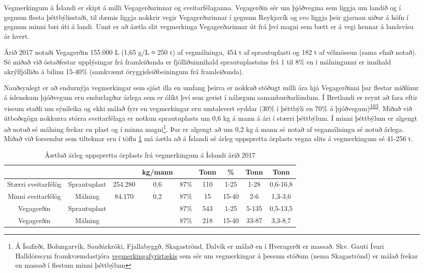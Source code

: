 \documentclass[icelandic,]{book}
\let\rmarkdownfootnote\footnote%
\def\footnote{\protect\rmarkdownfootnote}
\begin{document}
Vegmerkingum á Íslandi er skipt á milli Vegagerðarinnar og sveitarfélaganna. Vegagerðin sér um þjóðvegina sem liggja um landið og í gegnum flesta þéttbýlisstaði, til dæmis liggja nokkrir vegir Vegagerðarinnar í gegnum Reykjavík og svo liggja þeir gjarnan niður á höfn í gegnum minni bæi úti á landi. Unnt er að áætla slit vegmerkinga Vegagerðarinnar út frá því magni sem bætt er á vegi hennar á landsvísu ár hvert.

Árið 2017 notaði Vegagerðin 155.000 L (1,65 g/L ≈ 250 t) af vegmálningu, 454 t af sprautuplasti og 182 t af vélmössun (sama efnið notað). Sé miðað við óstaðfestar upplýsingar frá framleiðanda er fjölliðuinnihald sprautuplastsins frá 1 til 8\% en í málningunni er innihald akrýlfjölliða á bilinu 15-40\% (samkvæmt öryggisleiðbeiningum frá framleiðanda).

Nauðsynlegt er að endurnýja vegmerkingar sem sjást illa en umfang þeirra er nokkuð stöðugt milli ára hjá Vegagerðinni þar flestar miðlínur á íslenskum þjóðvegum eru endurlagðar árlega sem er ólíkt því sem gerist í nálægum samanburðarlöndum. Í Bretlandi er reynt að fara eftir vissum staðli um sýnileika og ekki málað fyrr en vegmerkingar eru umtalsvert eyddar (30\% í þéttbýli en 70\% á þjóðvegum)\textsuperscript{\protect\hyperlink{ref-Hann2018}{103}}. Miðað við útboðsgögn nokkurra stórra sveitarfélaga er notkun sprautuplasts um 0,6 kg á mann á ári í stærri þéttbýlum. Í minni þéttbýlum er algengt að notuð sé málning frekar en plast og í minna magni\footnote{Á Ísafirði, Bolungarvík, Sauðárkróki, Fjallabyggð, Skagaströnd, Dalvík er málað en í Hveragerði er massað. Skv. Gauti Ívari Halldórssyni framkvæmdastjóra \href{http://www.bilastaedamalun.is/}{vegmerkingafyrirtækis} sem sér um vegmerkingar á þessum stöðum (nema Skagaströnd) er málað frekar en massað í flestum minni þéttbýlum}. Þar er algengt að um 0,2 kg á mann sé notað af vegamálningu sé notuð árlega. Miðað við forsendur sem tilteknar eru í töflu \ref{tab:vegmerkingar} má áætla að á Íslandi sé árleg uppspretta örplasts vegna slits á vegmerkingum sé 41-256 t.

\begin{table}[t]

\caption{\label{tab:vegmerkingar}Áætluð árleg uppspretta örplasts frá vegmerkingum á Íslandi árið 2017}
\centering
\begin{tabular}{ccccccccc}
\toprule
 &  &  & kg/mann &  & Tonn & \% & Tonn & Tonn\\
\midrule
Stærri sveitarfélög & Sprautuplast & 254.280 & 0,6 & 87\% & 110 & 1-25 & 1-28 & 0,6-16,8\\
Minni sveitarfélög & Málning & 84.170 & 0,2 & 87\% & 15 & 15-40 & 2-6 & 1,3-3,6\\
Vegagerðin & Sprautuplast &  &  & 87\% & 543 & 1-25 & 5-135 & 0,5-13,5\\
Vegagerðin & Málning &  &  & 87\% & 218 & 15-40 & 33-87 & 3,3-8,7\\
\bottomrule
\end{tabular}
\end{table}
\end{document}
